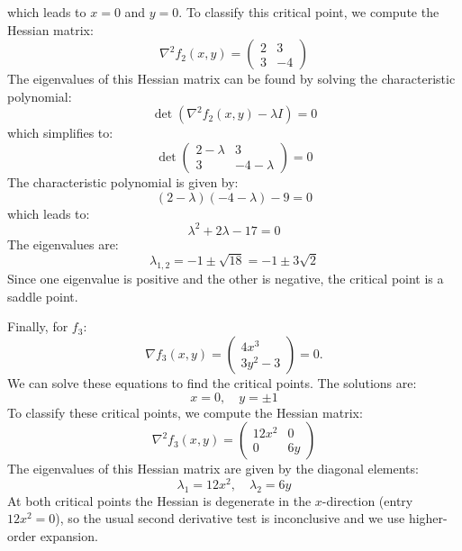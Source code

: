 \begin{answer}
\begin{answerenum}
\[            \]
            which leads to \(x = 0\) and \(y = 0\).
            To classify this critical point, we compute the Hessian matrix:
            \[
            \nabla^2 f_2(x,y) = \begin{pmatrix}
            2 & 3 \\
            3 & -4
            \end{pmatrix}
            \]
            The eigenvalues of this Hessian matrix can be found by solving the characteristic polynomial:
            \[
            \det\left(\nabla^2 f_2(x,y) - \lambda I\right) = 0
            \]
            which simplifies to:
            \[
            \det\begin{pmatrix}
            2 - \lambda & 3 \\
            3 & -4 - \lambda
            \end{pmatrix} = 0
            \]
            The characteristic polynomial is given by:
            \[
            (2 - \lambda)(-4 - \lambda) - 9 = 0
            \]
            which leads to:
            \[
            \lambda^2 + 2\lambda - 17 = 0
            \]
            The eigenvalues are:
            \[
            \lambda_{1,2} = -1 \pm \sqrt{18} = -1 \pm 3\sqrt{2}
            \]
            Since one eigenvalue is positive and the other is negative, the critical point is a saddle point.

        \item Finally, for \(f_3\):
            \[
            \nabla f_3(x,y) = \begin{pmatrix}
            4x^3 \\
            3y^2 - 3
            \end{pmatrix} = 0.
            \]
            We can solve these equations to find the critical points. The solutions are:
            \[
            x = 0, \quad y = \pm 1
            \]
            To classify these critical points, we compute the Hessian matrix:
            \[
            \nabla^2 f_3(x,y) = \begin{pmatrix}
            12x^2 & 0 \\
            0 & 6y
            \end{pmatrix}
            \]
            The eigenvalues of this Hessian matrix are given by the diagonal elements:
            \[
            \lambda_1 = 12x^2, \quad \lambda_2 = 6y
            \]
            At both critical points the Hessian is degenerate in the $x$-direction (entry $12x^2=0$), so the usual second derivative test is inconclusive and we use higher-order expansion.


\end{answerenum}
\end{answer}

